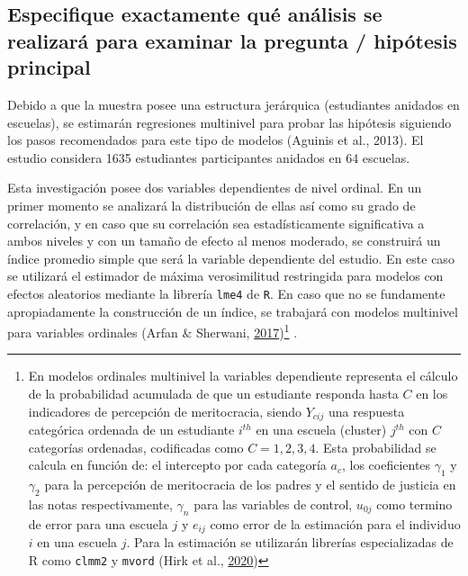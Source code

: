 \documentclass[
  12pt,
]{article}
\begin{document}
\hypertarget{especifique-exactamente-quuxe9-anuxe1lisis-se-realizaruxe1-para-examinar-la-pregunta-hipuxf3tesis-principal}{%
\subsection{Especifique exactamente qué análisis se realizará para
examinar la pregunta / hipótesis
principal}\label{especifique-exactamente-quuxe9-anuxe1lisis-se-realizaruxe1-para-examinar-la-pregunta-hipuxf3tesis-principal}}

Debido a que la muestra posee una estructura jerárquica (estudiantes
anidados en escuelas), se estimarán regresiones multinivel para probar
las hipótesis siguiendo los pasos recomendados para este tipo de modelos
(Aguinis et al., 2013). El estudio considera 1635 estudiantes
participantes anidados en 64 escuelas.

Esta investigación posee dos variables dependientes de nivel ordinal. En
un primer momento se analizará la distribución de ellas así como su
grado de correlación, y en caso que su correlación sea estadísticamente
significativa a ambos niveles y con un tamaño de efecto al menos
moderado, se construirá un índice promedio simple que será la variable
dependiente del estudio. En este caso se utilizará el estimador de
máxima verosimilitud restringida para modelos con efectos aleatorios
mediante la librería \texttt{lme4} de \texttt{R}. En caso que no se
fundamente apropiadamente la construcción de un índice, se trabajará con
modelos multinivel para variables ordinales (Arfan \& Sherwani,
\protect\hyperlink{ref-arfan_Ordinal_2017}{2017})\footnote{En modelos
  ordinales multinivel la variables dependiente representa el cálculo de
  la probabilidad acumulada de que un estudiante responda hasta \(C\) en
  los indicadores de percepción de meritocracia, siendo \(Y_{cij}\) una
  respuesta categórica ordenada de un estudiante \(i^{th}\) en una
  escuela (cluster) \(j^{th}\) con \(C\) categorías ordenadas,
  codificadas como \(C = 1,2,3,4\). Esta probabilidad se calcula en
  función de: el intercepto por cada categoría \(a_c\), los coeficientes
  \(\gamma_1\) y \(\gamma_2\) para la percepción de meritocracia de los
  padres y el sentido de justicia en las notas respectivamente,
  \(\gamma_n\) para las variables de control, \(u_{0j}\) como termino de
  error para una escuela \(j\) y \(e_{ij}\) como error de la estimación
  para el individuo \(i\) en una escuela \(j\). Para la estimación se
  utilizarán librerías especializadas de R como \texttt{clmm2} y
  \texttt{mvord} (Hirk et al.,
  \protect\hyperlink{ref-hirk_mvord_2020}{2020})} .
\end{document}
